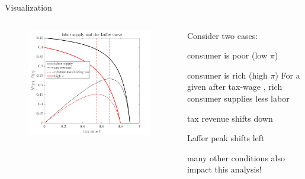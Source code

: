 \documentclass[11pt,aspectratio=169,usenames,dvipsnames]{beamer}
\let\tempone\itemize
\let\temptwo\enditemize
\renewenvironment{itemize}{\tempone\addtolength{\itemsep}{\fill}}{\temptwo}
\let\tempa\enumerate
\let\tempb\endenumerate
\renewenvironment{enumerate}{\tempa\addtolength{\itemsep}{\fill}}{\tempb}
\begin{document}
\begin{frame}{Visualization}
\label{slide:Visualization}
    \begin{columns}
        \begin{column}{0.5\textwidth}
            \begin{figure}
                \includegraphics[width=\textwidth]{./figures/lafferCurve.png}
            \end{figure}


        \end{column}
        \begin{column}{0.5\textwidth}
            Consider two cases:
            \begin{enumerate}
                \item consumer is poor (low $ \pi $)
                \item consumer is rich (high $ \pi $)
            \end{enumerate}
            For a given after tax-wage , rich consumer supplies less labor
            \begin{itemize}
                \item tax revenue shifts down
                \item Laffer peak shifts left
                \item many other conditions also impact this analysis!
            \end{itemize}
        \end{column}
    \end{columns}
\end{frame}
\end{document}
